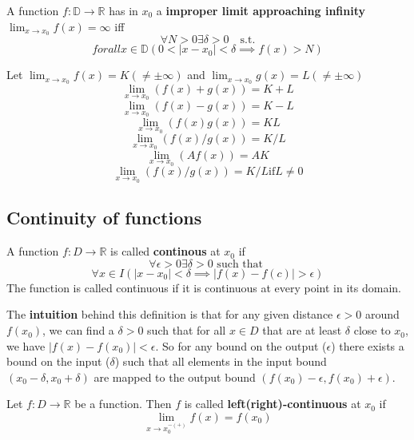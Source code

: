\begin{definition}
    A function $f: \mathbb{D} \to \mathbb{R}$ has in $x_0$ a \textbf{improper limit approaching infinity} $\lim_{x \to x_0} f(x) = \infty$ iff 
    $$\forall N > 0 \exists \delta > 0 \quad \text{s.t.}$$
    $$forall x \in \mathbb{D} (0 < |x - x_0| < \delta \implies f(x) > N)$$
\end{definition}

\begin{theorem}
    Let $\lim_{x \to x_0} f(x) = K (\neq \pm \infty)$ and $\lim_{x \to x_0} g(x) = L (\neq \pm \infty)$
    $$\lim_{x \to x_0} (f(x) + g(x)) = K + L$$
    $$\lim_{x \to x_0} (f(x) - g(x)) = K - L$$
    $$\lim_{x \to x_0} (f(x) g(x)) = K L$$
    $$\lim_{x \to x_0} (f(x) / g(x)) = K / L$$
    $$\lim_{x \to x_0} (A f(x)) = A K$$
    $$\lim_{x \to x_0} (f(x)/g(x)) = K/L \text{if} L \neq 0$$
\end{theorem}

\subsection{Continuity of functions}

\begin{definition}
    A function $f: D \to \mathbb{R}$ is called \textbf{continous} at $x_0$ if
    $$\forall \epsilon \gt 0 \exists \delta \gt 0 \text{ such that }$$
    $$\forall x \in I (\mid x - x_0 \mid \lt \delta \implies \mid f(x) - f(c) \mid \gt \epsilon)$$
    The function is called continuous if it is continuous at every point in its domain.
\end{definition}

\begin{remark}
    The \textbf{intuition} behind this definition is that for any given distance $\epsilon > 0$ around $f(x_0)$, we can find a $\delta > 0$ such that for all $x \in D$ that are at least $\delta$ close to $x_0$, we have $|f(x) - f(x_0)| < \epsilon$. 
    So for any bound on the output ($\epsilon$) there exists a bound on the input ($\delta$) such that all elements in the input bound $(x_0 - \delta, x_0 + \delta)$ are mapped to the output bound $(f(x_0) - \epsilon, f(x_0) + \epsilon)$.
\end{remark}

\begin{definition}
    Let $f: D \to \mathbb{R}$ be a function. Then $f$ is called \textbf{left(right)-continuous} at $x_0$ if
    $$\lim_{x \to x_0^{-(+)}} f(x) = f(x_0)$$
\end{definition}

